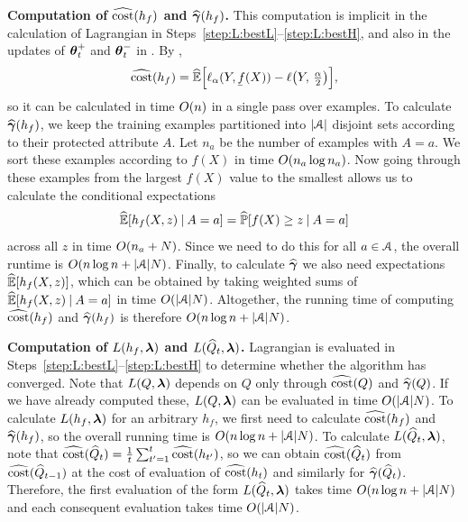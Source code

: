 

\textbf{Computation of $\widehat{\textup{\mdseries cost}}(h_f)$ and $\widehat{\boldsymbol{\gamma}}(h_f)$.} This computation is implicit in the calculation of Lagrangian in Steps~\ref{step:L:bestL}--\ref{step:L:bestH}, and also in the updates of $\boldsymbol{\theta}_t^+$ and $\boldsymbol{\theta}_t^-$ in . By ,
\[
  \hcost(h_f)=\Ehat\BigBracks{\ell_\alpha(Y,\underf(X))-\ell\bigParens{Y,\,\tfrac{\alpha}{2}}},
\]
so it can be calculated in time $O(n)$ in a single pass over examples. To calculate $\widehat{\boldsymbol{\gamma}}(h_f)$, we keep the training examples partitioned
into $\lvert\mathcal{A}\rvert$ disjoint sets according to their protected attribute $A$. Let $n_{a}$ be the number of examples with $A=a$.
We sort these examples according to $f(X)$ in time $O(n_{a}\log n_{a})$. Now going through these examples from the largest $f(X)$ value to the smallest allows us to calculate the conditional expectations
\[
  \widehat{\mathbb{E}}[h_f(X,z)\mathbin{\vert} A=a] = \widehat{\mathbb{P}}[f(X)\ge z\mathbin{\vert} A=a]
\]
across all $z$ in time $O(n_{a}+N)$. Since we need to do this for all $a\in\mathcal{A}$,
the overall runtime is $O(n\log n+\lvert\mathcal{A}\rvert N)$. Finally, to
calculate $\widehat{\boldsymbol{\gamma}}$ we also need expectations $\widehat{\mathbb{E}}[h_f(X,z)]$, which can be obtained by taking weighted sums
of $\widehat{\mathbb{E}}[h_f(X,z)\mathbin{\vert} A=a]$ in time $O(\lvert\mathcal{A}\rvert N)$. Altogether, the running time
of computing $\widehat{\textup{\mdseries cost}}(h_f)$ and $\widehat{\boldsymbol{\gamma}}(h_f)$ is therefore $O(n\log n+\lvert\mathcal{A}\rvert N)$.

\textbf{Computation of $L(h_f,\boldsymbol{\lambda})$ and $L(\widehat{Q}_t,\boldsymbol{\lambda})$.} Lagrangian is evaluated in Steps~\ref{step:L:bestL}--\ref{step:L:bestH} to determine whether the algorithm has converged. Note that $L(Q,\boldsymbol{\lambda})$ depends on $Q$ only through $\widehat{\textup{\mdseries cost}}(Q)$ and $\widehat{\boldsymbol{\gamma}}(Q)$.
If we have already computed these, $L(Q,\boldsymbol{\lambda})$ can be evaluated in time $O(\lvert\mathcal{A}\rvert N)$. To calculate $L(h_f,\boldsymbol{\lambda})$ for an arbitrary
$h_f$, we first need to calculate $\widehat{\textup{\mdseries cost}}(h_f)$ and $\widehat{\boldsymbol{\gamma}}(h_f)$, so the overall running time is $O(n\log n+\lvert\mathcal{A}\rvert N)$. To calculate
$L(\widehat{Q}_t,\boldsymbol{\lambda})$, note that $\widehat{\textup{\mdseries cost}}(\widehat{Q}_t)=\frac{1}{t}\sum_{t'=1}^t\widehat{\textup{\mdseries cost}}(h_{t'})$, so we can obtain $\widehat{\textup{\mdseries cost}}(\widehat{Q}_t)$ from $\widehat{\textup{\mdseries cost}}(\widehat{Q}_{t-1})$ at the cost of evaluation
of $\widehat{\textup{\mdseries cost}}(h_t)$ and similarly for $\widehat{\boldsymbol{\gamma}}(\widehat{Q}_t)$. Therefore, the first evaluation of the form $L(\widehat{Q}_t,\boldsymbol{\lambda})$ takes time $O(n\log n+\lvert\mathcal{A}\rvert N)$
and each consequent evaluation takes time $O(\lvert\mathcal{A}\rvert N)$.

